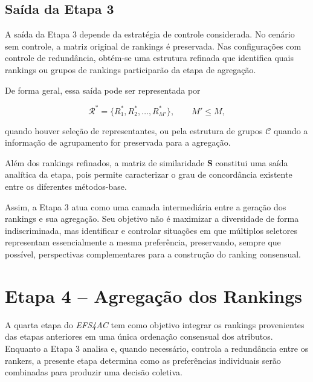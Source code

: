\subsection{Saída da Etapa 3}
\label{subsec:ac-efs-saida-etapa3}

A saída da Etapa 3 depende da estratégia de controle considerada. No cenário
sem controle, a matriz original de rankings é preservada. Nas configurações
com controle de redundância, obtém-se uma estrutura refinada que identifica
quais rankings ou grupos de rankings participarão da etapa de agregação.

De forma geral, essa saída pode ser representada por

\begin{equation}
    \mathcal{R}^{*}
    =
    \{R^{*}_1,R^{*}_2,\ldots,R^{*}_{M'}\},
    \qquad
    M'\leq M,
    \label{eq:rankings-refinados-ac-efs}
\end{equation}

quando houver seleção de representantes, ou pela estrutura de grupos
$\mathcal{C}$ quando a informação de agrupamento for preservada para a
agregação.

Além dos rankings refinados, a matriz de similaridade $\mathbf{S}$ constitui
uma saída analítica da etapa, pois permite caracterizar o grau de concordância
existente entre os diferentes métodos-base.

Assim, a Etapa 3 atua como uma camada intermediária entre a geração dos
rankings e sua agregação. Seu objetivo não é maximizar a diversidade de forma
indiscriminada, mas identificar e controlar situações em que múltiplos
seletores representam essencialmente a mesma preferência, preservando, sempre
que possível, perspectivas complementares para a construção do ranking
consensual.
\section{Etapa 4 -- Agregação dos Rankings}
\label{sec:ac-efs-etapa4}

A quarta etapa do \textit{EFS4AC} tem como objetivo integrar os rankings
provenientes das etapas anteriores em uma única ordenação consensual dos
atributos. Enquanto a Etapa 3 analisa e, quando necessário, controla a
redundância entre os rankers, a presente etapa determina como as preferências
individuais serão combinadas para produzir uma decisão coletiva.

